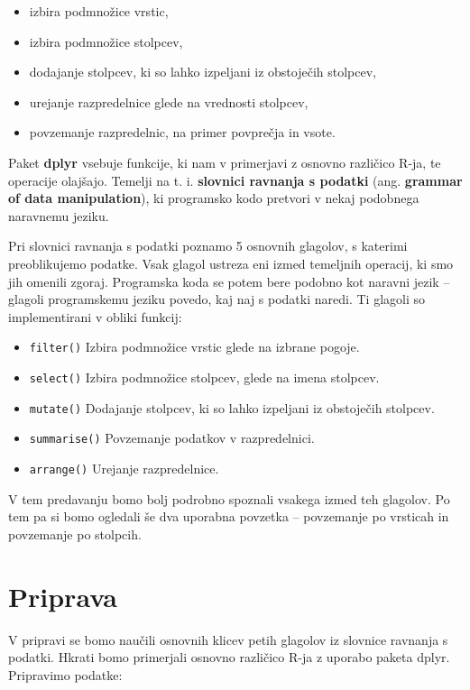 \documentclass[
]{book}
\providecommand{\tightlist}{%
  \setlength{\itemsep}{0pt}\setlength{\parskip}{0pt}}
\begin{document}
\begin{itemize}
\tightlist
\item
  izbira podmnožice vrstic,
\item
  izbira podmnožice stolpcev,
\item
  dodajanje stolpcev, ki so lahko izpeljani iz obstoječih stolpcev,
\item
  urejanje razpredelnice glede na vrednosti stolpcev,
\item
  povzemanje razpredelnic, na primer povprečja in vsote.
\end{itemize}

Paket \textbf{dplyr} vsebuje funkcije, ki nam v primerjavi z osnovno različico R-ja, te operacije olajšajo. Temelji na t. i. \textbf{slovnici ravnanja s podatki} (ang. \textbf{grammar of data manipulation}), ki programsko kodo pretvori v nekaj podobnega naravnemu jeziku.

Pri slovnici ravnanja s podatki poznamo 5 osnovnih glagolov, s katerimi preoblikujemo podatke. Vsak glagol ustreza eni izmed temeljnih operacij, ki smo jih omenili zgoraj. Programska koda se potem bere podobno kot naravni jezik -- glagoli programskemu jeziku povedo, kaj naj s podatki naredi. Ti glagoli so implementirani v obliki funkcij:

\begin{itemize}
\tightlist
\item
  \texttt{filter()} Izbira podmnožice vrstic glede na izbrane pogoje.
\item
  \texttt{select()} Izbira podmnožice stolpcev, glede na imena stolpcev.
\item
  \texttt{mutate()} Dodajanje stolpcev, ki so lahko izpeljani iz obstoječih stolpcev.
\item
  \texttt{summarise()} Povzemanje podatkov v razpredelnici.
\item
  \texttt{arrange()} Urejanje razpredelnice.
\end{itemize}

V tem predavanju bomo bolj podrobno spoznali vsakega izmed teh glagolov. Po tem pa si bomo ogledali še dva uporabna povzetka -- povzemanje po vrsticah in povzemanje po stolpcih.

\hypertarget{priprava}{%
\section{Priprava}\label{priprava}}

V pripravi se bomo naučili osnovnih klicev petih glagolov iz slovnice ravnanja s podatki. Hkrati bomo primerjali osnovno različico R-ja z uporabo paketa dplyr. Pripravimo podatke:
\end{document}
